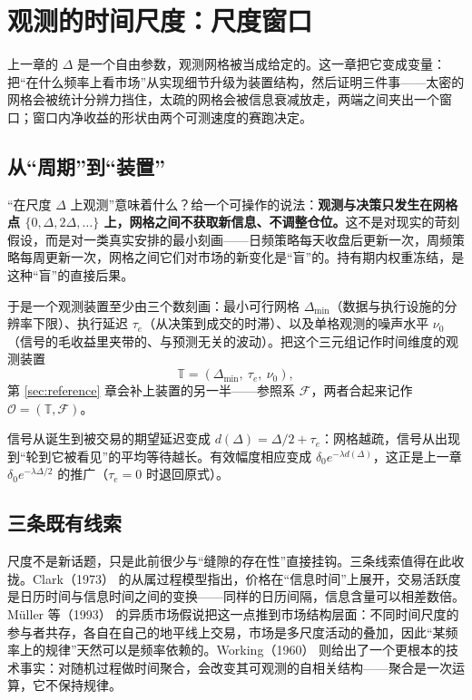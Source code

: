 \section{观测的时间尺度：尺度窗口}\label{sec:measurement}

上一章的 $\Delta$ 是一个自由参数，观测网格被当成给定的。这一章把它变成变量：把“在什么频率上看市场”从实现细节升级为装置结构，然后证明三件事——太密的网格会被统计分辨力挡住，太疏的网格会被信息衰减放走，两端之间夹出一个窗口；窗口内净收益的形状由两个可测速度的赛跑决定。

\subsection{从“周期”到“装置”}

“在尺度 $\Delta$ 上观测”意味着什么？给一个可操作的说法：\textbf{观测与决策只发生在网格点 $\{0,\Delta,2\Delta,\dots\}$ 上，网格之间不获取新信息、不调整仓位。}这不是对现实的苛刻假设，而是对一类真实安排的最小刻画——日频策略每天收盘后更新一次，周频策略每周更新一次，网格之间它们对市场的新变化是“盲”的。持有期内权重冻结，是这种“盲”的直接后果。

于是一个观测装置至少由三个数刻画：最小可行网格 $\Delta_{\min}$（数据与执行设施的分辨率下限）、执行延迟 $\tau_e$（从决策到成交的时滞）、以及单格观测的噪声水平 $\nu_0$（信号的毛收益里夹带的、与预测无关的波动）。把这个三元组记作时间维度的观测装置
\begin{equation}
  \mathbb{T} = (\Delta_{\min},\ \tau_e,\ \nu_0),
\end{equation}
第 \ref{sec:reference} 章会补上装置的另一半——参照系 $\mathcal{F}$，两者合起来记作 $\mathcal{O}=(\mathbb{T},\mathcal{F})$。

信号从诞生到被交易的期望延迟变成 $d(\Delta)=\Delta/2+\tau_e$：网格越疏，信号从出现到“轮到它被看见”的平均等待越长。有效幅度相应变成 $\delta_0 e^{-\lambda d(\Delta)}$，这正是上一章 $\delta_0 e^{-\lambda\Delta/2}$ 的推广（$\tau_e=0$ 时退回原式）。

\subsection{三条既有线索}

尺度不是新话题，只是此前很少与“缝隙的存在性”直接挂钩。三条线索值得在此收拢。Clark（1973）\cite{clark1973} 的从属过程模型指出，价格在“信息时间”上展开，交易活跃度是日历时间与信息时间之间的变换——同样的日历间隔，信息含量可以相差数倍。Müller 等（1993）\cite{muller1993} 的异质市场假说把这一点推到市场结构层面：不同时间尺度的参与者共存，各自在自己的地平线上交易，市场是多尺度活动的叠加，因此“某频率上的规律”天然可以是频率依赖的。Working（1960）\cite{working1960} 则给出了一个更根本的技术事实：对随机过程做时间聚合，会改变其可观测的自相关结构——聚合是一次运算，它不保持规律。

